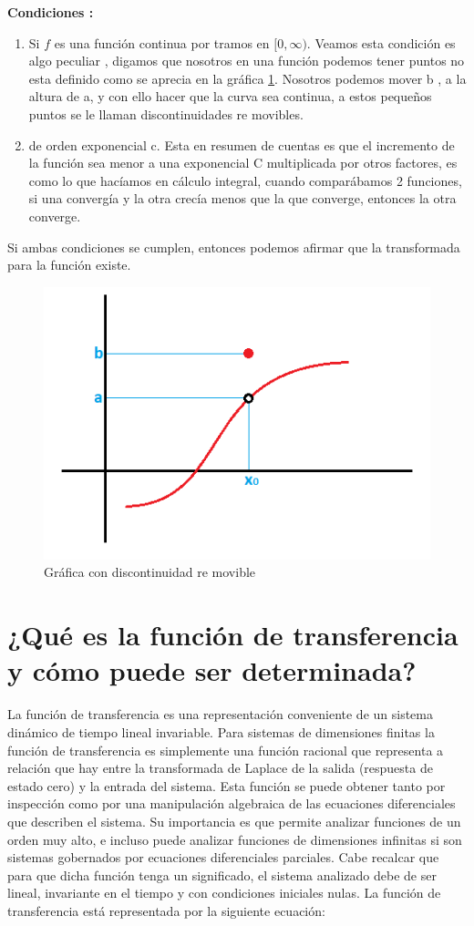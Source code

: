 \textbf{Condiciones :}
\begin{enumerate}
	\item Si $ f  $ es una función continua por tramos en $ [0, \infty) $.
	\subitem Veamos esta condición es algo peculiar , digamos  que nosotros en una función podemos tener puntos no esta definido como se aprecia en la gráfica \ref{fig:ilustracion1}. Nosotros podemos mover b , a la altura de a, y con ello hacer que la curva sea continua, a estos pequeños puntos se le llaman discontinuidades re movibles.
	\item  de orden exponencial c.
	\subitem Esta en resumen de cuentas es que el incremento de la función sea menor a una exponencial C multiplicada por otros factores, es como lo que hacíamos en cálculo integral, cuando comparábamos 2 funciones, si una convergía y la otra crecía menos que la que converge, entonces la otra converge.
\end{enumerate}

Si ambas condiciones se cumplen, entonces podemos afirmar que la transformada para la función existe.

\begin{figure}[h]
	\centering
	\includegraphics[width=0.7\linewidth]{img/ilustracion_1}
	\caption{Gráfica con discontinuidad re movible}
	\label{fig:ilustracion1}
\end{figure}


\section{¿Qué es la función de transferencia y cómo puede ser determinada?}	
La función de transferencia es una representación conveniente de un sistema dinámico de tiempo lineal invariable. Para sistemas de dimensiones finitas la función de transferencia es simplemente una función racional que representa a relación que hay entre la transformada de Laplace de la salida (respuesta de estado cero) y la entrada del sistema. Esta función se puede obtener tanto por inspección como por una manipulación algebraica de las ecuaciones diferenciales que describen el sistema. Su importancia es que permite analizar funciones de un orden muy alto, e incluso puede analizar funciones de dimensiones infinitas si son sistemas gobernados por ecuaciones diferenciales parciales. Cabe recalcar que para que dicha función tenga un significado, el sistema analizado debe de ser lineal, invariante en el tiempo y con condiciones iniciales nulas. La función de transferencia está representada por la siguiente ecuación:

